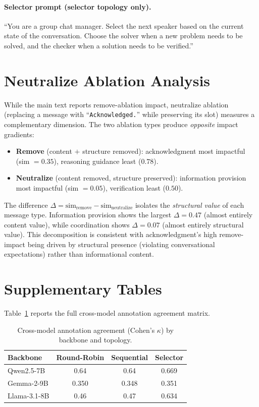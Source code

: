 \paragraph{Selector prompt (selector topology only).} ``You are a group chat manager. Select the next speaker based on the current state of the conversation. Choose the solver when a new problem needs to be solved, and the checker when a solution needs to be verified.''

\section{Neutralize Ablation Analysis}
\label{app:neutralize}

While the main text reports remove-ablation impact, neutralize ablation (replacing a message with ``\texttt{Acknowledged.}'' while preserving its slot) measures a complementary dimension. The two ablation types produce \emph{opposite} impact gradients:

\begin{itemize}[nosep, leftmargin=*]
    \item \textbf{Remove} (content $+$ structure removed): acknowledgment most impactful (sim $= 0.35$), reasoning guidance least ($0.78$).
    \item \textbf{Neutralize} (content removed, structure preserved): information provision most impactful (sim $= 0.05$), verification least ($0.50$).
\end{itemize}

The difference $\Delta = \text{sim}_{\text{remove}} - \text{sim}_{\text{neutralize}}$ isolates the \emph{structural value} of each message type. Information provision shows the largest $\Delta = 0.47$ (almost entirely content value), while coordination shows $\Delta = 0.07$ (almost entirely structural value). This decomposition is consistent with acknowledgment's high remove-impact being driven by structural presence (violating conversational expectations) rather than informational content.

\section{Supplementary Tables}
\label{app:supplementary}

Table~\ref{tab:kappa_full} reports the full cross-model annotation agreement matrix.

\begin{table}[htbp]
\centering
\caption{Cross-model annotation agreement (Cohen's $\kappa$) by backbone and topology.}
\label{tab:kappa_full}
\small
\begin{tabular}{lccc}
\toprule
\textbf{Backbone} & \textbf{Round-Robin} & \textbf{Sequential} & \textbf{Selector} \\
\midrule
Qwen2.5-7B  & 0.64 & 0.64 & 0.669 \\
Gemma-2-9B  & 0.350 & 0.348 & 0.351 \\
Llama-3.1-8B & 0.46 & 0.47 & 0.634 \\
\bottomrule
\end{tabular}
\end{table}


